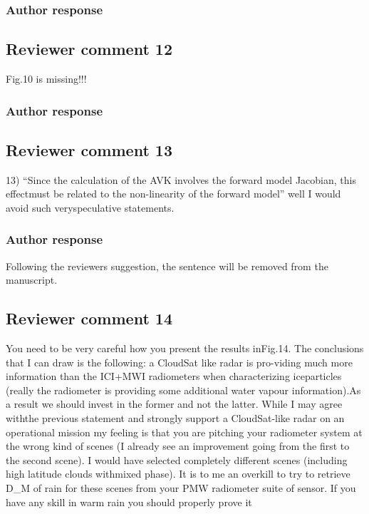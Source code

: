 \documentclass[11pt]{scrartcl}
\begin{document}
\subsubsection*{Author response}

\subsection*{Reviewer comment 12}
Fig.10 is missing!!!
\subsubsection*{Author response}

\subsection*{Reviewer comment 13}
13) “Since the calculation of the AVK involves the forward model Jacobian, this effectmust be related to the non-linearity of the forward model” well I would avoid such veryspeculative statements.

\subsubsection*{Author response}

Following the reviewers suggestion, the sentence will be removed from the manuscript.



\subsection*{Reviewer comment 14}
You need to be very careful how you present the results inFig.14. The
conclusions that I can draw is the following: a CloudSat like radar is
pro-viding much more information than the ICI+MWI radiometers when
characterizing iceparticles (really the radiometer is providing some additional
water vapour information).As a result we should invest in the former and not the
latter. While I may agree withthe previous statement and strongly support a
CloudSat-like radar on an operational mission my feeling is that you are
pitching your radiometer system at the wrong kind of scenes (I already see an
improvement going from the first to the second scene). I would have selected
completely different scenes (including high latitude clouds withmixed phase). It
is to me an overkill to try to retrieve D\_M of rain for these scenes from your
PMW radiometer suite of sensor. If you have any skill in warm rain you
should properly prove it
\end{document}
